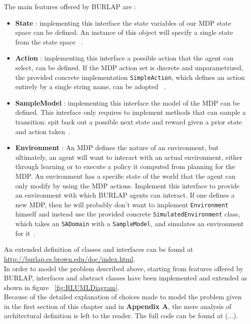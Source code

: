 The main features offered by BURLAP are :
	
\begin{itemize}
	\item \textbf{State} : implementing this interface the state variables of our MDP state space can be defined. An instance of this object will specify a single state from the state space~\cite{BURLAPSite} .
	\item \textbf{Action} : implementing this interface a possible action that the agent can select, can be defined. If the MDP action set is discrete and unparametrized, the provided concrete implementation {\tt SimpleAction}, which defines an action entirely by a single string name, can be adopted ~\cite{BURLAPSite}.
	\item \textbf{SampleModel} : implementing this interface the model of the MDP can be defined. This interface only requires to implement methods that can sample a transition: spit back out a possible next state and reward given a prior state and action taken~\cite{BURLAPSite}.
	\item  \textbf{Environment} : An MDP defines the nature of an environment, but ultimately, an agent will want to interact with an actual environment, either through learning or to execute a policy it computed from planning for the MDP. An environment has a specific state of the world that the agent can only modify by using the MDP actions. Implement this interface to provide an environment with which BURLAP agents can interact. If one defines a new MDP, then he will probably don't want to implement {\tt Environment} himself and instead use the provided concrete {\tt SimulatedEnvironment} class, which takes an {\tt SADomain} with a {\tt SampleModel}, and simulates an environment for it~\cite{BURLAPSite}.
\end{itemize}

An extended definition of classes and interfaces can be found at \url{http://burlap.cs.brown.edu/doc/index.html}. \\

In order to model the problem described above, starting from features offered by BURLAP, interfaces and abstract classes have been implemented and extended as shown in figure ~\ref{fig:RLUMLDiagram}. \\

Because of the detailed explanation of choices made to model the problem given in the first section of this chapter and in \textbf{Appendix A}, the mere analysis of architectural definition is left to the reader. The full code can be found at (...).

